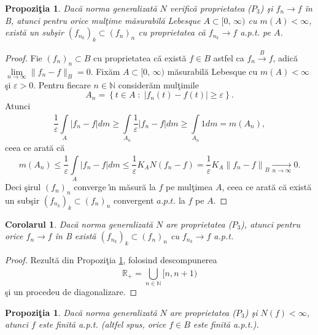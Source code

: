 \documentclass[ a4paper, 12pt]{report}
\newtheorem{prop}[theorem]{\bf Propozi\c tia }
\newtheorem{cor}[theorem]{\bf Corolarul}
\theoremstyle{definition}
\theoremstyle{remark}
\numberwithin{equation}{section}
\begin{document}
\begin{prop}\label{aptA}
Dac\u a norma generalizat\u a $N$ verific\u a proprietatea ($P_3$) \c si $f_n \rightarrow f$ \^in B, atunci pentru orice mul\c time m\u asurabil\u a Lebesque $A \subset [0, \, \infty)$ cu $m(A)<\infty$, exist\u a un sub\c sir $(f_{n_k})_k \subset (f_n)_n$ cu proprietatea c\u a $f_{n_k} \rightarrow f$ a.p.t. pe $A$.
\end{prop}

\begin{proof}
Fie $(f_n)_n \subset B$ cu proprietatea c\u a exist\u a $f \in B$ astfel ca  $f_n \xrightarrow{B} f$, adic\u a $\lim\limits_{n \to \infty} \lVert f_n-f \rVert_B = 0$.
Fix\u am $A \subset [0, \, \infty)$ m\u asurabil\u a Lebesque cu $m(A)<\infty$ \c si $\varepsilon>0$. Pentru fiecare $n \in \mathbb{N}$ consider\u am mul\c timile
$$A_n=\left\{ t \in A \; : \; \lvert f_n(t)-f(t) \rvert \geq \varepsilon \right\}.$$
Atunci
$$\frac{1}{\varepsilon} \int\limits_{A}^{}{\lvert f_n-f \rvert} dm \geq  \int\limits_{A_n}^{}{\frac{1}{\varepsilon} \lvert f_n-f \rvert} dm \geq \int\limits_{A_n}{}{1 dm} = m(A_n),$$
 ceea ce arat\u a c\u a
 $$m(A_n) \leq \frac{1}{\varepsilon} \int\limits_{A}^{}{\lvert f_n-f \rvert} dm \leq \frac{1}{\varepsilon} K_A N(f_n-f)=\frac{1}{\varepsilon} K_A {\lVert f_n-f \rVert}_B \xrightarrow[n \rightarrow \infty]{} 0.$$
Deci \c sirul $(f_n)_n$ converge \^\i n m\u asur\u a la $f$ pe mul\c timea $A$, ceea ce arat\u a c\u a exist\u a un sub\c sir $(f_{n_k})_k \subset (f_n)_n$ convergent $a.p.t.$ la $f$ pe $A$.
\end{proof}

\begin{cor}
Dac\u a norma generalizat\u a $N$ are proprietatea ($P_3$), atunci pentru orice $f_n \rightarrow f$ \^in B exist\u a $(f_{n_k})_k \subset (f_n)_n$ cu $f_{n_k} \rightarrow f$ a.p.t.
\end{cor}

\begin{proof}
Rezult\u a din Propozi\c tia \ref{aptA}, folosind descompunerea
$$\mathbb{R_+}=\bigcup\limits_{n \in \mathbb{N}}^{}{[n,n+1)}$$ \c si un procedeu de diagonalizare.
\end{proof}

\begin{prop}
Dac\u a norma generalizat\u a $N$ are proprietatea ($P_3$) \c si $N(f)<\infty$, atunci $f$ este finit\u a a.p.t. (altfel spus, orice $f \in B$ este finit\u a a.p.t.).
\end{prop}
\end{document}
